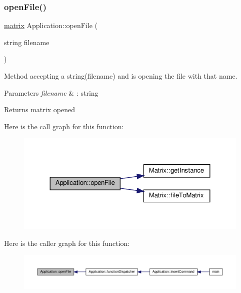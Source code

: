 \subsubsection{\texorpdfstring{open\+File()}{openFile()}}
{\footnotesize\ttfamily \hyperlink{formula_8h_a869e2a5deeb3daa4c82d6bc91cf20d92}{matrix} Application\+::open\+File (\begin{DoxyParamCaption}\item[{string}]{filename }\end{DoxyParamCaption})\hspace{0.3cm}{\ttfamily [private]}}

Method accepting a string(filename) and is opening the file with that name. 
\begin{DoxyParams}{Parameters}
{\em filename} & \+: string \\
\hline
\end{DoxyParams}
\begin{DoxyReturn}{Returns}
matrix opened 
\end{DoxyReturn}
Here is the call graph for this function\+:\nopagebreak
\begin{figure}[H]
\begin{center}
\leavevmode
\includegraphics[width=324pt]{class_application_ab2f161414a4e2f16e28321c192051006_cgraph}
\end{center}
\end{figure}
Here is the caller graph for this function\+:\nopagebreak
\begin{figure}[H]
\begin{center}
\leavevmode
\includegraphics[width=350pt]{class_application_ab2f161414a4e2f16e28321c192051006_icgraph}
\end{center}
\end{figure}
\mbox{\label{class_application_a2bc1937440cb9e71dace95c3fe7ed4ea}} 
